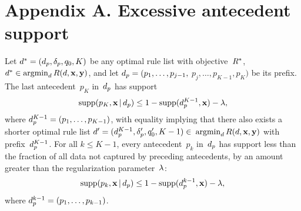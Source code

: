 \section*{Appendix A. Excessive antecedent support}

\begin{theorem}
\label{thm:ub-support}
Let ${d^* = (d_p, \delta_p, q_0, K)}$
be any optimal rule list with objective~$R^*$, \ie
${d^* \in \operatorname*{argmin}_{d} R({d}, \mathbf{x}, \mathbf{y})}$,
and let ${d_p = (p_1, \dots, p_{j-1},}$
${p_j, \dots, p_{K-1}, p_K)}$ be its prefix.
%
The last antecedent~$p_K$ in~$d_p$ has support
\begin{align}
\textnormal{supp}(p_K, \mathbf{x} \,|\, d_p) \le 1 - \textnormal{supp}(d_p^{K-1}, \mathbf{x}) - {\lambda},
\label{eq:ub-support-last}
\end{align}
where ${d_p^{K-1} = (p_1, \dots, p_{K-1})}$,
with equality implying that there also exists a shorter optimal rule list
${{d}' = (d_p^{K-1}, \delta_p', q_0', K - 1) \in}$ ${\operatorname*{argmin}_{d} R({d}, \mathbf{x}, \mathbf{y})}$
with prefix~$d_p^{K-1}$.
%
For all ${k \le K - 1}$, every antecedent~$p_k$ in~$d_p$ has support
less than the fraction of all data not captured by preceding antecedents,
by an amount greater than the regularization parameter~${\lambda}$:
\begin{align}
\textnormal{supp}(p_k, \mathbf{x} \,|\, d_p) \le 1 - \textnormal{supp}(d_p^{k-1}, \mathbf{x}) - {\lambda},
\label{eq:ub-support}
\end{align}
where ${d_p^{k-1} = (p_1, \dots, p_{k-1})}$.
\end{theorem}

